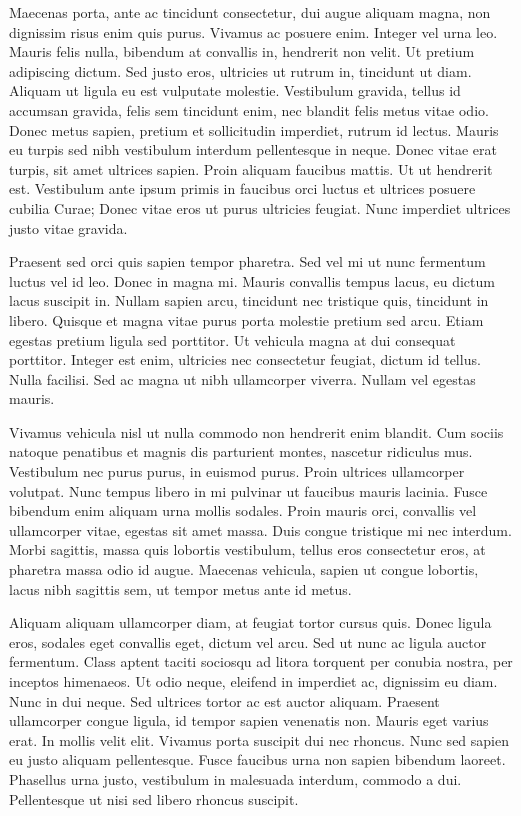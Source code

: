 \documentclass[a4paper]{article}
\begin{document}
Maecenas porta, ante ac tincidunt consectetur, dui augue aliquam magna, non dignissim risus enim quis purus. Vivamus ac posuere enim. Integer vel urna leo. Mauris felis nulla, bibendum at convallis in, hendrerit non velit. Ut pretium adipiscing dictum. Sed justo eros, ultricies ut rutrum in, tincidunt ut diam. Aliquam ut ligula eu est vulputate molestie. Vestibulum gravida, tellus id accumsan gravida, felis sem tincidunt enim, nec blandit felis metus vitae odio. Donec metus sapien, pretium et sollicitudin imperdiet, rutrum id lectus. Mauris eu turpis sed nibh vestibulum interdum pellentesque in neque. Donec vitae erat turpis, sit amet ultrices sapien. Proin aliquam faucibus mattis. Ut ut hendrerit est. Vestibulum ante ipsum primis in faucibus orci luctus et ultrices posuere cubilia Curae; Donec vitae eros ut purus ultricies feugiat. Nunc imperdiet ultrices justo vitae gravida.

Praesent sed orci quis sapien tempor pharetra. Sed vel mi ut nunc fermentum luctus vel id leo. Donec in magna mi. Mauris convallis tempus lacus, eu dictum lacus suscipit in. Nullam sapien arcu, tincidunt nec tristique quis, tincidunt in libero. Quisque et magna vitae purus porta molestie pretium sed arcu. Etiam egestas pretium ligula sed porttitor. Ut vehicula magna at dui consequat porttitor. Integer est enim, ultricies nec consectetur feugiat, dictum id tellus. Nulla facilisi. Sed ac magna ut nibh ullamcorper viverra. Nullam vel egestas mauris.

Vivamus vehicula nisl ut nulla commodo non hendrerit enim blandit. Cum sociis natoque penatibus et magnis dis parturient montes, nascetur ridiculus mus. Vestibulum nec purus purus, in euismod purus. Proin ultrices ullamcorper volutpat. Nunc tempus libero in mi pulvinar ut faucibus mauris lacinia. Fusce bibendum enim aliquam urna mollis sodales. Proin mauris orci, convallis vel ullamcorper vitae, egestas sit amet massa. Duis congue tristique mi nec interdum. Morbi sagittis, massa quis lobortis vestibulum, tellus eros consectetur eros, at pharetra massa odio id augue. Maecenas vehicula, sapien ut congue lobortis, lacus nibh sagittis sem, ut tempor metus ante id metus.

Aliquam aliquam ullamcorper diam, at feugiat tortor cursus quis. Donec ligula eros, sodales eget convallis eget, dictum vel arcu. Sed ut nunc ac ligula auctor fermentum. Class aptent taciti sociosqu ad litora torquent per conubia nostra, per inceptos himenaeos. Ut odio neque, eleifend in imperdiet ac, dignissim eu diam. Nunc in dui neque. Sed ultrices tortor ac est auctor aliquam. Praesent ullamcorper congue ligula, id tempor sapien venenatis non. Mauris eget varius erat. In mollis velit elit. Vivamus porta suscipit dui nec rhoncus. Nunc sed sapien eu justo aliquam pellentesque. Fusce faucibus urna non sapien bibendum laoreet. Phasellus urna justo, vestibulum in malesuada interdum, commodo a dui. Pellentesque ut nisi sed libero rhoncus suscipit.
\end{document}
